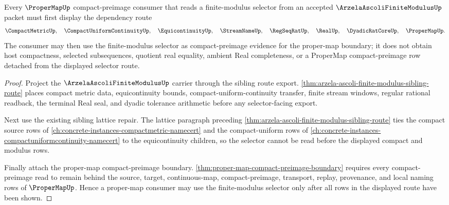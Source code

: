 \begin{theorem}
\label{thm:arzela-ascoli-finite-modulus-proper-map-consumer}
Every $\ProperMapUp$ compact-preimage consumer that reads a finite-modulus
selector from an accepted $\ArzelaAscoliFiniteModulusUp$ packet must first
display the dependency route
$$
\CompactMetricUp,\quad \CompactUniformContinuityUp,\quad \EquicontinuityUp,\quad
\StreamNameUp,\quad \RegSeqRatUp,\quad \RealUp,\quad \DyadicRatCoreUp,\quad
\ProperMapUp .
$$
The consumer may then use the finite-modulus selector as compact-preimage
evidence for the proper-map boundary; it does not obtain host compactness,
selected subsequences, quotient real equality, ambient Real completeness, or a
ProperMap compact-preimage row detached from the displayed selector route.
\end{theorem}
\begin{proof}
Project the $\ArzelaAscoliFiniteModulusUp$ carrier through the sibling route export. \autoref{thm:arzela-ascoli-finite-modulus-sibling-route} places compact metric data, equicontinuity bounds, compact-uniform-continuity transfer, finite stream windows, regular rational readback, the terminal Real seal, and dyadic tolerance arithmetic before any selector-facing export.

Next use the existing sibling lattice repair. The lattice paragraph preceding \autoref{thm:arzela-ascoli-finite-modulus-sibling-route} ties the compact source rows of \autoref{ch:concrete-instances-compactmetric-namecert} and the compact-uniform rows of \autoref{ch:concrete-instances-compactuniformcontinuity-namecert} to the equicontinuity children, so the selector cannot be read before the displayed compact and modulus rows.

Finally attach the proper-map compact-preimage boundary. \autoref{thm:proper-map-compact-preimage-boundary} requires every compact-preimage read to remain behind the source, target, continuous-map, compact-preimage, transport, replay, provenance, and local naming rows of $\ProperMapUp$. Hence a proper-map consumer may use the finite-modulus selector only after all rows in the displayed route have been shown.
\end{proof}
